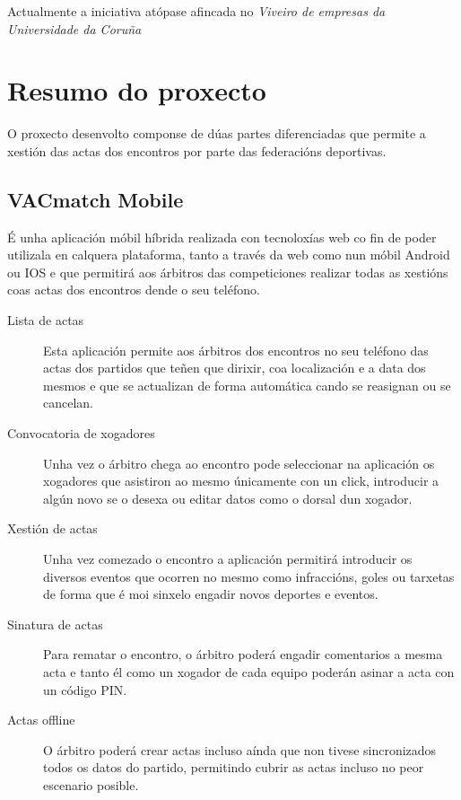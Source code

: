    Actualmente a iniciativa atópase afincada no \emph{Viveiro de empresas da Universidade 
da Coruña}

    \section{Resumo do proxecto}
    O proxecto desenvolto componse de dúas partes diferenciadas que permite a 
xestión das actas dos encontros por parte das federacións deportivas.
    
    \subsection{VACmatch Mobile}
    É unha aplicación móbil híbrida realizada con tecnoloxías web co fin de 
poder utilizala en calquera plataforma, tanto a través da web como nun móbil 
Android ou IOS e que permitirá aos árbitros das competiciones realizar 
todas as xestións coas actas dos encontros dende o seu teléfono.

  \begin{description}
    \item [Lista de actas]
    Esta aplicación permite aos árbitros dos encontros no seu teléfono 
das actas dos partidos que teñen que dirixir, coa localización e a data dos 
mesmos e que se actualizan de forma automática cando se reasignan ou se 
cancelan.

    \item [Convocatoria de xogadores]
    Unha vez o árbitro chega ao encontro pode seleccionar na aplicación os 
xogadores que asistiron ao mesmo únicamente con un click, introducir a algún 
novo se o desexa ou editar datos como o dorsal dun xogador.

    \item [Xestión de actas]
    Unha vez comezado o encontro a aplicación permitirá introducir os diversos 
eventos que ocorren no mesmo como infraccións, goles ou tarxetas de forma que é 
moi sinxelo engadir novos deportes e eventos.
    
    \item [Sinatura de actas]
    Para rematar o encontro, o árbitro poderá engadir comentarios a mesma acta 
e tanto él como un xogador de cada equipo poderán asinar a acta con un código 
PIN.

    \item [Actas offline]
    O árbitro poderá crear actas incluso aínda que non tivese sincronizados 
todos os datos do partido, permitindo cubrir as actas incluso no peor escenario 
posible.

  \end{description} 

